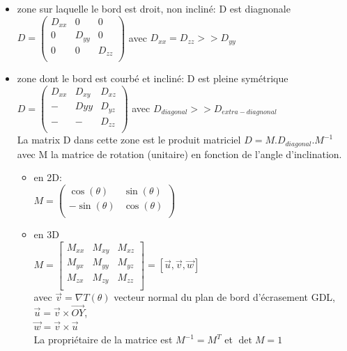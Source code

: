 \documentclass{article}
\begin{document}
	\begin{itemize}
		\item zone sur laquelle le bord est droit, non incliné: D est diagnonale \\
		$ D = \left( 
			\begin{matrix}
			D_{xx} & 0 & 0\\
			0 & D_{yy} & 0\\
			0 & 0 & D_{zz}\\
			\end{matrix} 
			\right) $
		avec $ D_{xx} = D_{zz} >> D_{yy} $
		\item zone dont le bord est courbé et incliné: D est pleine symétrique \\
		$ D = \left( 
		\begin{matrix}
		D_{xx} & D_{xy} & D_{xz}\\
		- & Dyy & D_{yz}\\
		- & - & D_{zz}\\
		\end{matrix} 
		\right) $ 
		avec $ D_{diagonal} >> D_{extra-diagnonal} $ \\
		La matrix D dans cette zone est le produit matriciel $D = M.D_{diagonal}.M^{-1}$ avec M la matrice de rotation (unitaire) en fonction de l'angle d'inclination.
		\begin{itemize}
			\item en 2D: \\ 
			$ M = \left( 
			\begin{matrix}
			\cos(\theta) & \sin(\theta)\\
			-\sin(\theta) & \cos(\theta)\\
			\end{matrix} 
			\right) $
			\item en 3D \\
			$ M = \left[ 
			\begin{matrix}
			M_{xx} & M_{xy} & M_{xz}\\
			M_{yx} & M_{yy} & M_{yz}\\
			M_{zx} & M_{zy} & M_{zz}\\
			\end{matrix} 
			\right]  
			= \left[ \vec{u}, \vec{v}, \vec{w} \right] $ \\
			avec $\vec{v} = \nabla T(\theta)$ vecteur normal du plan de bord d'écrasement GDL, \\ 
			$\vec{u} = \vec{v} \times \vec{OY}$, \\ 
			$\vec{w} = \vec{v} \times \vec{u}$ \\
			La propriétaire de la matrice est $ M^{-1} = M^T$ et $\det{M}=1$ \\
		\end{itemize} 
		

\end{itemize}
\end{document}
